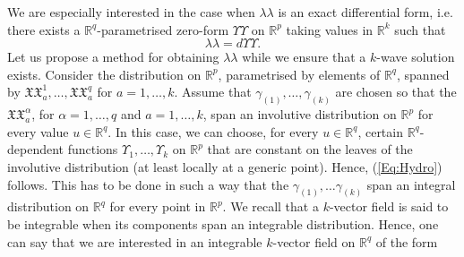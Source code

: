 \documentclass{birkjour}
\theoremstyle{definition}
\theoremstyle{remark}
\numberwithin{equation}{section}
\numberwithin{equation}{section}
\numberwithin{thm}{section}
\numberwithin{equation}{section}
\numberwithin{thm}{section}
\begin{document}
We are especially interested in the case when $ \lambda\!\!\!\!\lambda$ is an exact differential form, i.e. there exists a $\mathbb{R}^{q}$-parametrised zero-form $\Upsilon\!\!\!\!\!\Upsilon$ on $\mathbb{R}^p$ taking values in $\mathbb{R}^k$ such that
\begin{equation}\label{eq:gammaUpsilon}
	\lambda\!\!\!\!\lambda=d\Upsilon\!\!\!\!\!\Upsilon.
\end{equation}
Let us propose a method for obtaining $ \lambda\!\!\!\!\lambda$ while we ensure that a $k$-wave solution exists. Consider the distribution on $\mathbb{R}^p$, parametrised by elements of $\mathbb{R}^q$, spanned by $\mathfrak{X}\!\!\!\!\mathfrak{X}_a^1,\ldots,\mathfrak{X}\!\!\!\!\mathfrak{X}_a^q$ for $a=1,\ldots,k$. %
Assume that $\gamma_{(1)},\ldots,\gamma_{(k)}$ are chosen so that the $\mathfrak{X}\!\!\!\!\mathfrak{X}_a^\alpha$, for $\alpha=1,\ldots,q$ and $a=1,\ldots,k$, span an involutive distribution on $\mathbb{R}^p$ for every value $u\in \mathbb{R}^q$. In this case, we can choose, for every $u\in \mathbb{R}^q$, certain $\mathbb{R}^q$-dependent functions $\Upsilon_1,\ldots,\Upsilon_k$ on $\mathbb{R}^p$ that are constant on the leaves of the involutive distribution (at least locally at a generic point). Hence, (\ref{Eq:Hydro}) follows. This has to be done in such a way that the $\gamma_{(1)},\ldots\gamma_{(k)}$ span an integral distribution on $\mathbb{R}^q$ for every point in $\mathbb{R}^p$. We recall that a $k$-vector field is said to be integrable when its components span an integrable distribution. Hence, one can say that we are interested in an integrable $k$-vector field on $\mathbb{R}^q$  of the form
\end{document}
